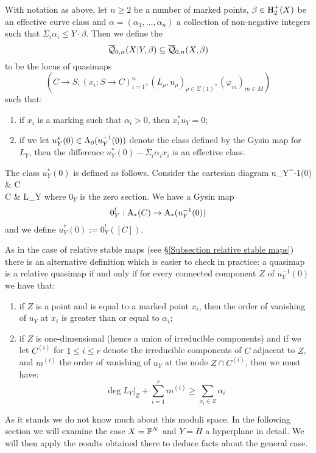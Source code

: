 \begin{definition} With notation as above, let $n \geq 2$ be a number of marked points, $\beta \in \operatorname{H}_2^+(X)$ be an effective curve class and $\alpha=(\alpha_1, \ldots, \alpha_n)$ a collection of non-negative integers such that $\Sigma_i \alpha_i \leq Y \cdot \beta$. Then we define the 
\begin{equation*} \overline{\mathcal Q}_{0,\alpha}(X|Y,\beta) \subseteq \overline{\mathcal Q}_{0,n}(X,\beta) \end{equation*}
to be the locus of quasimaps
\begin{equation*} (C \to S, (x_i : S \to C)_{i=1}^n, (L_\rho,u_\rho)_{\rho \in \Sigma(1)}, (\varphi_m)_{m \in M}) \end{equation*}
such that:
\begin{enumerate}
\item if $x_i$ is a marking such that $\alpha_i > 0$, then $x_i^* u_Y = 0$;
\item if we let $u_Y^*(0) \in \operatorname{A}_0(u_Y^{-1}(0))$ denote the class defined by the Gysin map for $L_Y$, then the difference $u_Y^*(0) - \Sigma_i \alpha_i x_i$ is an effective class.
\end{enumerate}
\end{definition}

The class $u_Y^*(0)$ is defined as follows. Consider the cartesian diagram
\bcd
u_Y^{-1}(0) \ar[r] \ar[d]  & C \ar[d,"u_Y"] \\
C \ar[r,"0_Y"] & L_Y
\ecd
where $0_Y$ is the zero section. We have a Gysin map
\begin{equation*} 0_Y^! : \operatorname{A}_*(C) \rightarrow \operatorname{A}_*(u_Y^{-1}(0)) \end{equation*}
and we define $u_Y^*(0) := 0_Y^!([C])$.


\begin{remark} As in the case of relative stable maps (see \S \ref{Subsection relative stable maps}) there is an alternative definition which is easier to check in practice: a quasimap is a relative quasimap if and only if for every connected component $Z$ of $u_Y^{-1}(0)$ we have that:
\begin{enumerate}
\item if $Z$ is a point and is equal to a marked point $x_i$, then the order of vanishing of $u_Y$ at $x_i$ is greater than or equal to $\alpha_i$;
\item if $Z$ is one-dimensional (hence a union of irreducible components) and if we let $C^{(i)}$ for $1 \leq i \leq r$ denote the irreducible components of $C$ adjacent to $Z$, and $m^{(i)}$ the order of vanishing of $u_Y$ at the node $Z \cap C^{(i)}$, then we must have:
\begin{equation} \label{Relative quasimap internal component inequality} \deg L_Y|_Z + \sum_{i=1}^r m^{(i)} \geq \sum_{x_i \in Z} \alpha_i \end{equation}
\end{enumerate}
\end{remark}

As it stands we do not know much about this moduli space. In the following section we will examine the case $X=\mathbb P^N$ and $Y=H$ a hyperplane in detail. We will then apply the results obtained there to deduce facts about the general case.